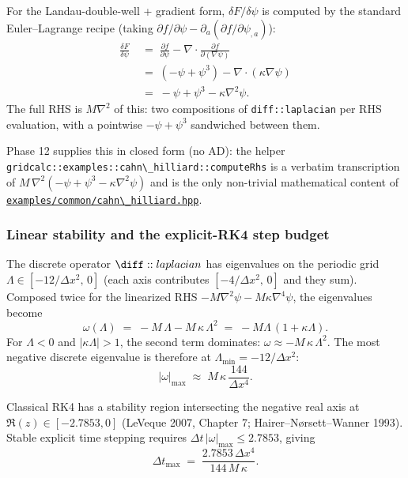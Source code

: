 For the Landau-double-well + gradient form,
\(\delta F/\delta\psi\) is computed by the standard
Euler--Lagrange recipe (taking
\(\partial f/\partial\psi - \partial_a (\partial f/\partial\psi_{,a})\)):
\begin{align*}
\frac{\delta F}{\delta\psi}
&\;=\; \frac{\partial f}{\partial\psi} - \nabla\!\cdot\!\frac{\partial f}{\partial(\nabla\psi)} \\
&\;=\; (-\psi + \psi^3) - \nabla\!\cdot\!(\kappa\nabla\psi) \\
&\;=\; -\psi + \psi^3 - \kappa\nabla^2\psi.
\end{align*}
The full RHS is \(M\nabla^2\) of this: two compositions of
\passthrough{\lstinline!diff::laplacian!} per RHS evaluation, with a
pointwise \(-\psi+\psi^3\) sandwiched between them.

Phase 12 supplies this in closed form (no AD): the helper
\passthrough{\lstinline!gridcalc::examples::cahn\_hilliard::computeRhs!}
is a verbatim transcription of
\(M\,\nabla^2(-\psi + \psi^3 - \kappa\nabla^2\psi)\) and is the only
non-trivial mathematical content of
\href{../../../examples/common/cahn_hilliard.hpp}{\passthrough{\lstinline!examples/common/cahn\_hilliard.hpp!}}.

\subsubsection{Linear stability and the explicit-RK4 step
budget}\label{phase12-rk4}

The discrete operator \(\diff::laplacian\) has eigenvalues on the
periodic grid \(\Lambda \in [-12/\Delta x^2,\,0]\) (each axis
contributes \([-4/\Delta x^2,\,0]\) and they sum). Composed twice for
the linearized RHS \(-M\nabla^2\psi - M\kappa\nabla^4\psi\), the
eigenvalues become
\[
\omega(\Lambda) \;=\; -M\,\Lambda - M\,\kappa\,\Lambda^2 \;=\; -M\Lambda\,(1 + \kappa\Lambda).
\]
For \(\Lambda<0\) and \(|\kappa\Lambda|>1\), the second term
dominates: \(\omega \approx -M\,\kappa\,\Lambda^2\).
The most negative discrete eigenvalue is therefore at
\(\Lambda_{\min} = -12/\Delta x^2\):
\[
|\omega|_{\max} \;\approx\; M\,\kappa\,\frac{144}{\Delta x^4}.
\]

Classical RK4 has a stability region intersecting the negative real
axis at \(\Re(z)\in [-2.7853, 0]\) (LeVeque 2007, Chapter 7;
Hairer--Nørsett--Wanner 1993). Stable explicit time stepping requires
\(\Delta t\,|\omega|_{\max}\le 2.7853\), giving
\[
\Delta t_{\max} \;=\; \frac{2.7853\,\Delta x^4}{144\,M\,\kappa}.
\]

